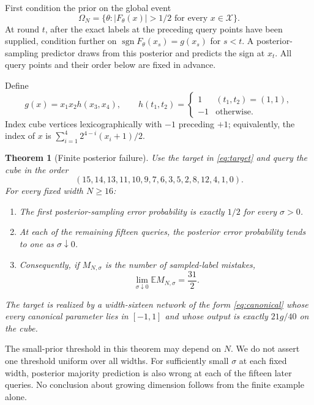 \documentclass[11pt]{article}
\newtheorem{theorem}{Theorem}[section]
\theoremstyle{remark}\newtheorem{remark}[theorem]{Remark}
\newcommand{\sgn}{\operatorname{sgn}}
\newcommand{\X}{\mathcal X}
\newcommand{\E}{\mathbb E}
\newcommand{\1}{\mathbf 1}
\begin{document}
First condition the prior on the global event
\[
\Omega_N=\{\theta: |F_\theta(x)|>1/2\text{ for every }x\in\X\}.
\]
At round $t$, after the exact labels at the preceding query points have been supplied, condition further on
$\sgn F_\theta(x_s)=g(x_s)$ for $s<t$. A posterior-sampling predictor draws from this posterior and predicts the sign at $x_t$. All query points and their order below are fixed in advance.

Define
\[
g(x)=x_1x_2h(x_3,x_4),\qquad
h(t_1,t_2)=\begin{cases}1&(t_1,t_2)=(1,1),\\-1&\text{otherwise}.\end{cases}
\tag{3}\label{eq:target}
\]
Index cube vertices lexicographically with $-1$ preceding $+1$; equivalently, the index of $x$ is $\sum_{i=1}^4 2^{4-i}(x_i+1)/2$.

\begin{theorem}[Finite posterior failure]\label{thm:main}
Use the target in \eqref{eq:target} and query the cube in the order
\[
(15,14,13,11,10,9,7,6,3,5,2,8,12,4,1,0).
\tag{4}\label{eq:order}
\]
For every fixed width $N\ge16$:
\begin{enumerate}[label=(\roman*),itemsep=2pt]
\item The first posterior-sampling error probability is exactly $1/2$ for every $\sigma>0$.
\item At each of the remaining fifteen queries, the posterior error probability tends to one as $\sigma\downarrow0$.
\item Consequently, if $M_{N,\sigma}$ is the number of sampled-label mistakes,
\[
\lim_{\sigma\downarrow0}\E M_{N,\sigma}=\frac{31}{2}.
\]
\end{enumerate}
The target is realized by a width-sixteen network of the form \eqref{eq:canonical} whose every canonical parameter lies in $[-1,1]$ and whose output is exactly $21g/40$ on the cube.
\end{theorem}

The small-prior threshold in this theorem may depend on $N$. We do not assert one threshold uniform over all widths. For sufficiently small $\sigma$ at each fixed width, posterior majority prediction is also wrong at each of the fifteen later queries. No conclusion about growing dimension follows from the finite example alone.
\end{document}
